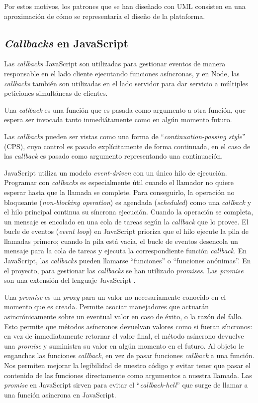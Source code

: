 Por estos motivos, los patrones que se han diseñado con UML consisten en una aproximación de cómo se representaría el diseño de la plataforma.


\subsection{	\textit{Callbacks} en JavaScript}
Las \textit{callbacks} JavaScript son utilizadas para gestionar eventos de manera responsable en el lado cliente ejecutando funciones asíncronas, y en Node, las \textit{callbacks} también son utilizadas en el lado servidor para dar servicio a múltiples peticiones simultáneas de clientes.


Una \textit{callback} es una función que es pasada como argumento a otra función, que espera ser invocada tanto inmediátamente como en algún momento futuro.


Las \textit{callbacks} pueden ser vistas como una forma de ``\textit{continuation-passing style}'' (CPS), cuyo control es pasado explícitamente de forma continuada, en el caso de las \textit{callback} es pasado como argumento representando una continuación.


JavaScript utiliza un modelo \textit{event-driven} con un único hilo de ejecución. Programar con \textit{callbacks} es especialmente útil cuando el llamador no quiere esperar hasta que la llamada se complete. Para conseguirlo, la operación no bloqueante (\textit{non-blocking operation}) es agendada (\textit{scheduled}) como una \textit{callback} y el hilo principal continua su síncrona ejecución. Cuando la operación se completa, un mensaje es encolado en una cola de tareas según la \textit{callback} que lo provee. El bucle de eventos (\textit{event loop}) en JavaScript prioriza que el hilo ejecute la pila de llamadas primero; cuando la pila está vacía, el bucle de eventos desencola un mensaje para la cola de tareas y ejecuta la correspondiente función \textit{callback}.
En JavaScript, las \textit{callbacks} pueden llamarse ``funciones'' o ``funciones anónimas''.
En el proyecto, para gestionar las \textit{callbacks} se han utilizado \textit{promises}. Las \textit{promise} son una extensión del lenguaje JavaScript \cite{keheliyagallabaalimesbahivanbeschastnikh2015}.


Una \textit{promise} es un \textit{proxy} para un valor no necesariamente conocido en el momento que es creada. Permite asociar manejadores que actuarán asincrónicamente sobre un eventual valor en caso de éxito, o la razón del fallo. Esto permite que métodos asíncronos devuelvan valores como si fueran síncronos: en vez de inmediatamente retornar el valor final, el método asíncrono devuelve una \textit{promise} y suministra su valor en algún momento en el futuro\cite{promise_objeto}. Al objeto le enganchas las funciones \textit{callback}, en vez de pasar funciones \textit{callback} a una función\cite{promise_mozilla}. Nos permiten mejorar la legibilidad de nuestro código y evitar tener que pasar el contenido de las funciones directamente como argumentos a nuestra llamada. Las \textit{promise} en JavaScript sirven para evitar el ``\textit{callback-hell}'' que surge de llamar a una función asíncrona en JavaScript. 


